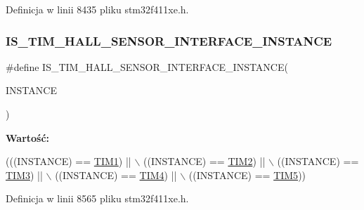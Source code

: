 Definicja w linii 8435 pliku stm32f411xe.\+h.

\mbox{\label{group___exported__macros_ga979ea18ba0931f5ed15cc2f3ac84794b}} 
\subsubsection{\texorpdfstring{I\+S\+\_\+\+T\+I\+M\+\_\+\+H\+A\+L\+L\+\_\+\+S\+E\+N\+S\+O\+R\+\_\+\+I\+N\+T\+E\+R\+F\+A\+C\+E\+\_\+\+I\+N\+S\+T\+A\+N\+CE}{IS\_TIM\_HALL\_SENSOR\_INTERFACE\_INSTANCE}}
{\footnotesize\ttfamily \#define I\+S\+\_\+\+T\+I\+M\+\_\+\+H\+A\+L\+L\+\_\+\+S\+E\+N\+S\+O\+R\+\_\+\+I\+N\+T\+E\+R\+F\+A\+C\+E\+\_\+\+I\+N\+S\+T\+A\+N\+CE(\begin{DoxyParamCaption}\item[{}]{I\+N\+S\+T\+A\+N\+CE }\end{DoxyParamCaption})}

{\bfseries Wartość\+:}
\begin{DoxyCode}
(((INSTANCE) == \hyperlink{group___peripheral__declaration_ga2e87451fea8dc9380056d3cfc5ed81fb}{TIM1}) || \(\backslash\)
                                                          ((INSTANCE) == \hyperlink{group___peripheral__declaration_ga3cfac9f2e43673f790f8668d48b4b92b}{TIM2}) || \(\backslash\)
                                                          ((INSTANCE) == \hyperlink{group___peripheral__declaration_ga61ee4c391385607d7af432b63905fcc9}{TIM3}) || \(\backslash\)
                                                          ((INSTANCE) == \hyperlink{group___peripheral__declaration_ga91a09bad8bdc7a1cb3d85cf49c94c8ec}{TIM4}) || \(\backslash\)
                                                          ((INSTANCE) == \hyperlink{group___peripheral__declaration_ga5125ff6a23a2ed66e2e19bd196128c14}{TIM5}))
\end{DoxyCode}


Definicja w linii 8565 pliku stm32f411xe.\+h.

